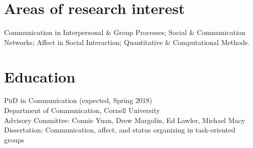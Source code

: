 \documentclass[11pt, letterpaper]{article} %
\newcommand{\years}[1]{\leavevmode\marginnote{\scriptsize #1}} %
\begin{document}

\section*{Areas of research interest}

Communication in Interpersonal \& Group Processes; Social \& Communication Networks; Affect in Social Interaction; Quantitative \& Computational Methods. %





\section*{Education}

\years{2012-}\textsc{PhD} in Communication (expected, Spring 2018)\\
    \textsf{
        Department of Communication, Cornell University\\
        Advisory Committee: Connie Yuan, Drew Margolin, Ed Lawler, Michael Macy\\
        Dissertation: Communication, affect, and status organizing in task-oriented groups
            } 
\end{document}
